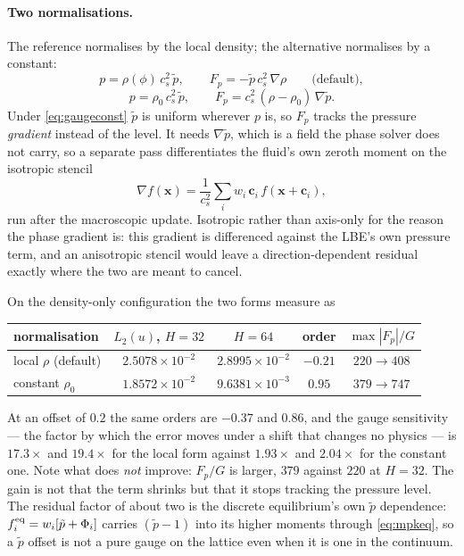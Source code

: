 \documentclass[11pt,a4paper]{article}
\newcommand{\cs}{c_s}
\newcommand{\ci}{\bm{c}_i}
\newcommand{\xx}{\bm{x}}
\newcommand{\e}[1]{\times 10^{#1}}
\begin{document}
\paragraph{Two normalisations.} The reference normalises by the local density; the
alternative normalises by a constant:
\begin{equation}
  p = \rho(\phi)\,\cs^2\,\tilde p,
  \qquad F_p = -\tilde p\,\cs^2\,\nabla\rho
  \qquad\text{(default)},
  \label{eq:gaugelocal}
\end{equation}
\begin{equation}
  p = \rho_0\,\cs^2\,\tilde p,
  \qquad F_p = \cs^2\,(\rho-\rho_0)\,\nabla\tilde p .
  \label{eq:gaugeconst}
\end{equation}
Under \eqref{eq:gaugeconst} $\tilde p$ is uniform wherever $p$ is, so $F_p$ tracks
the pressure \emph{gradient} instead of the level. It needs $\nabla\tilde p$, which
is a field the phase solver does not carry, so a separate pass differentiates the
fluid's own zeroth moment on the isotropic stencil
\begin{equation}
  \nabla f(\xx) = \frac{1}{\cs^2}\sum_i w_i\,\ci\,f(\xx+\ci),
  \label{eq:sgrad}
\end{equation}
run after the macroscopic update. Isotropic rather than axis-only for the reason
the phase gradient is: this gradient is differenced against the LBE's own pressure
term, and an anisotropic stencil would leave a direction-dependent residual
exactly where the two are meant to cancel.

On the density-only configuration the two forms measure as

\begin{center}\small
\begin{tabular}{lcccc}
\toprule
normalisation & $L_2(u)$, $H{=}32$ & $H{=}64$ & order & $\max|F_p|/G$ \\
\midrule
local $\rho$ (default) & $2.5078\e{-2}$ & $2.8995\e{-2}$ & $-0.21$ & $220 \to 408$ \\
constant $\rho_0$      & $1.8572\e{-2}$ & $9.6381\e{-3}$ & $0.95$  & $379 \to 747$ \\
\bottomrule
\end{tabular}
\end{center}

\noindent At an offset of $0.2$ the same orders are $-0.37$ and $0.86$, and the
gauge sensitivity --- the factor by which the error moves under a shift that
changes no physics --- is $17.3\times$ and $19.4\times$ for the local form against
$1.93\times$ and $2.04\times$ for the constant one. Note what does \emph{not}
improve: $F_p/G$ is larger, $379$ against $220$ at $H=32$. The gain is not that the
term shrinks but that it stops tracking the pressure level. The residual factor of
about two is the discrete equilibrium's own $\tilde p$ dependence:
$f_i^{\rm eq}=w_i[\tilde p+\Phi_i]$ carries $(\tilde p-1)$ into its higher moments
through \eqref{eq:mpkeq}, so a $\tilde p$ offset is not a pure gauge on the lattice
even when it is one in the continuum.
\end{document}
